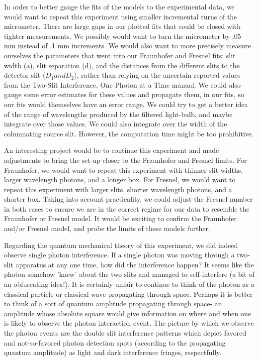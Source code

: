 \documentclass[prb,preprint]{revtex4-1}
\begin{document}
In order to better gauge the fits of the models to the experimental data, we would want to repeat this experiment using smaller incremental turns of the micrometer.  There are large gaps in our plotted fits that could be closed with tighter measurements.  We possibly would want to turn the micrometer by .05 mm instead of .1 mm increments.  We would also want to more precisely measure ourselves the parameters that went into our Fraunhofer and Fresnel fits:  slit width (a), slit separation (d), and the distances from the different slits to the detector slit ($D_{1} and D_{2}$), rather than relying on the uncertain reported values from the Two-Slit Interference, One Photon at a Time manual.  We could also gauge some error estimates for these values and propagate them, in our fits, so our fits would themselves have an error range.  We could try to get a better idea of the range of wavelengths produced by the filtered light-bulb, and maybe integrate over those values.  We could also integrate over the width of the columnating source slit.  However, the computation time might be too prohibitive. 

An interesting project would be to continue this experiment and made adjustments to bring the set-up closer to the Fraunhofer and Fresnel limits.  For Fraunhofer, we would want to repeat this experiment with thinner slit widths, larger wavelength photons, and a longer box.  For Fresnel, we would want to repeat this experiment with larger slits, shorter wavelength photons, and a shorter box.  Taking into account practicality, we could adjust the Fresnel number in both cases to ensure we are in the correct regime for our data to resemble the Fraunhofer or Fresnel model.  It would be exciting to confirm the Fraunhofer and/or Fresnel model, and probe the limits of these models further.

Regarding the quantum mechanical theory of this experiment, we did indeed observe single photon interference.  If a single photon was moving through a two-slit apparatus at any one time, how did the interference happen?  It seems like the photon somehow 'knew' about the two slits and managed to self-interfere (a bit of an obfuscating idea!).  It is certainly unfair to continue to think of the photon as a classical particle or classical wave propagating through space.  Perhaps it is better to think of a sort of quantum amplitude propagating through space- an amplitude whose absolute square would give information on where and when one is likely to observe the photon interaction event.  The picture by which we observe the photon events are the double slit interference patterns which depict favored and not-so-favored photon detection spots (according to the propagating quantum amplitude) as light and dark interference fringes, respectfully.  \cite{teachspin}
\end{document}
